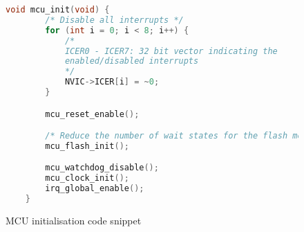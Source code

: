 \begin{figure}[H]
    \begin{center}
    \begin{lstlisting}[language=C]
    void mcu_init(void) {
        /* Disable all interrupts */
        for (int i = 0; i < 8; i++) {
            /* 
            ICER0 - ICER7: 32 bit vector indicating the 
            enabled/disabled interrupts 
            */
            NVIC->ICER[i] = ~0;
        }

        mcu_reset_enable();

        /* Reduce the number of wait states for the flash memory */
        mcu_flash_init();

        mcu_watchdog_disable();
        mcu_clock_init();
        irq_global_enable();
    }
    \end{lstlisting}
    \end{center}
    \caption{MCU initialisation code snippet}
    \label{fig:boot-mcu-init}
\end{figure}

